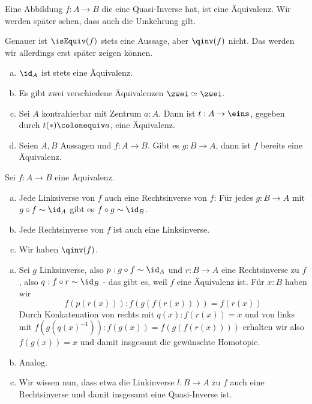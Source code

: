 \begin{bemerkung}
  Eine Abbildung $f:A\to B$ die eine Quasi-Inverse hat, ist eine Äquivalenz.
  Wir werden später sehen, dass auch die Umkehrung gilt.
\end{bemerkung}

Genauer ist $\isEquiv(f)$ stets eine Aussage, aber $\qinv(f)$ nicht.
Das werden wir allerdings erst später zeigen können.

\begin{beispiel}
  \begin{enumerate}[(a)]
  \item $\id_A$ ist stets eine Äquivalenz.
  \item Es gibt zwei verschiedene Äquivalenzen $\zwei\simeq \zwei$.
  \item Sei $A$ kontrahierbar mit Zentrum $a:A$.
    Dann ist $t:A\to\eins$, gegeben durch $t(\ast)\colonequiv a$, eine Äquivalenz.
  \item Seien $A,B$ Aussagen und $f:A\to B$.
    Gibt es $g:B\to A$, dann ist $f$ bereits eine Äquivalenz.
  \end{enumerate}
\end{beispiel}

\begin{lemma}
  Sei $f:A\to B$ eine Äquivalenz.
  \begin{enumerate}[(a)]
  \item Jede Linksiverse von $f$ auch eine Rechtsinverse von $f$:
     Für jedes $g:B\to A$ mit $g\circ f \sim \id_A$ gibt es $f\circ g\sim \id_B$.
   \item Jede Rechtsinverse von $f$ ist auch eine Linksinverse.
   \item Wir haben $\qinv(f)$.
  \end{enumerate}
\end{lemma}

\begin{beweis}
  \begin{enumerate}[(a)]
  \item Sei $g$ Linksinverse, also $p:g\circ f\sim \id_A$ und $r:B\to A$ eine Rechtsinverse zu $f$, also $q:f\circ r\sim\id_B$ - das gibt es, weil $f$ eine Äquivalenz ist.
    Für $x:B$ haben wir \[
    f(p(r(x))):f(g(f(r(x))))=f(r(x))
    \]
    Durch Konkatenation von rechts mit $q(x):f(r(x))=x$ und von links mit $f(g(q(x)^{-1})):f(g(x))=f(g(f(r(x))))$ erhalten wir also $f(g(x))=x$ und damit insgesamt die gewünschte Homotopie.
  \item Analog.
  \item Wir wissen nun, dass etwa die Linkinverse $l:B\to A$ zu $f$ auch eine Rechtsinverse und damit insgesamt eine Quasi-Inverse ist.
  \end{enumerate}
\end{beweis}

